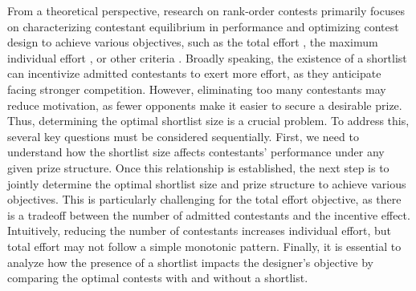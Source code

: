 From a theoretical perspective, research on rank-order contests primarily focuses on characterizing contestant equilibrium in performance and optimizing contest design to achieve various objectives, such as the total effort \cite{MS01}, the maximum individual effort \cite{CHS19}, or other criteria \cite{AS09,EGG21}.
Broadly speaking, the existence of a shortlist can incentivize admitted contestants to exert more effort, as they anticipate facing stronger competition. However, eliminating too many contestants may reduce motivation, as fewer opponents make it easier to secure a desirable prize. Thus, determining the optimal shortlist size is a crucial problem.
To address this, several key questions must be considered sequentially. First, we need to understand how the shortlist size affects contestants' performance under any given prize structure. Once this relationship is established, the next step is to jointly determine the optimal shortlist size and prize structure to achieve various objectives. This is particularly challenging for the total effort objective, as there is a tradeoff between the number of admitted contestants and the incentive effect. Intuitively, reducing the number of contestants increases individual effort, but total effort may not follow a simple monotonic pattern. Finally, it is essential to analyze how the presence of a shortlist impacts the designer’s objective by comparing the optimal contests with and without a shortlist.

